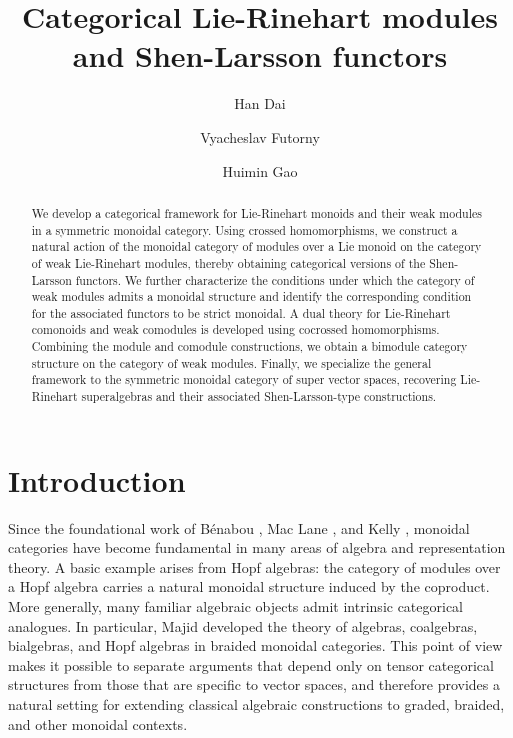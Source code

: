 \documentclass[11pt]{amsart}
\theoremstyle{definition}
\numberwithin{equation}{section}
\begin{document}
		
		\title{Categorical Lie-Rinehart modules and Shen-Larsson functors}
		\author{Han Dai}
		\address{School of Mathematics, Hefei University of Technology, Hefei, 230000, Anhui, P. R. China}
		\address{Shenzhen International Center for Mathematics, Southern University of Science and Technology, Shenzhen, 518055, Guangdong, P. R. China}
		\author{Vyacheslav Futorny}
		\author{Huimin Gao}
		\address{Shenzhen International Center for Mathematics, Southern University of Science and Technology, Shenzhen, 518055, Guangdong, P. R. China}
		
		
		\maketitle
		\thispagestyle{empty}
		
		
\begin{abstract}
We develop a categorical framework for Lie-Rinehart monoids and their weak modules in a symmetric monoidal category. Using crossed
homomorphisms, we construct a natural action of the monoidal category of modules over a Lie monoid on the category of weak Lie-Rinehart modules, thereby obtaining categorical versions of the Shen-Larsson functors. We further characterize the conditions under which the category of weak modules admits a monoidal structure and identify the corresponding condition for the associated functors to be strict monoidal. A dual theory for Lie-Rinehart comonoids and weak comodules is developed using cocrossed homomorphisms. Combining the module and comodule constructions, we obtain a bimodule category structure on the category of weak modules. Finally, we specialize the general framework to the symmetric monoidal category of super vector spaces, recovering Lie-Rinehart superalgebras and their associated Shen-Larsson-type constructions. 
\end{abstract}
		
\section{Introduction}
Since the foundational work of B\'enabou \cite{Ben63}, Mac Lane \cite{Mac63,Mac98}, and Kelly \cite{Kel64}, monoidal categories have become fundamental in many areas of algebra and representation theory. 
A basic example arises from Hopf algebras: the category of modules over a Hopf algebra carries a natural monoidal structure induced by the coproduct. 
More generally, many familiar algebraic objects admit intrinsic categorical analogues. 
In particular, Majid \cite{Maj93,Maj94} developed the theory of algebras, coalgebras, bialgebras, and Hopf algebras in braided monoidal categories. 
This point of view makes it possible to separate arguments that depend only on tensor categorical structures from those that are specific to vector spaces, and therefore provides a natural setting for extending classical algebraic constructions to graded, braided, and other monoidal contexts.
\end{document}
